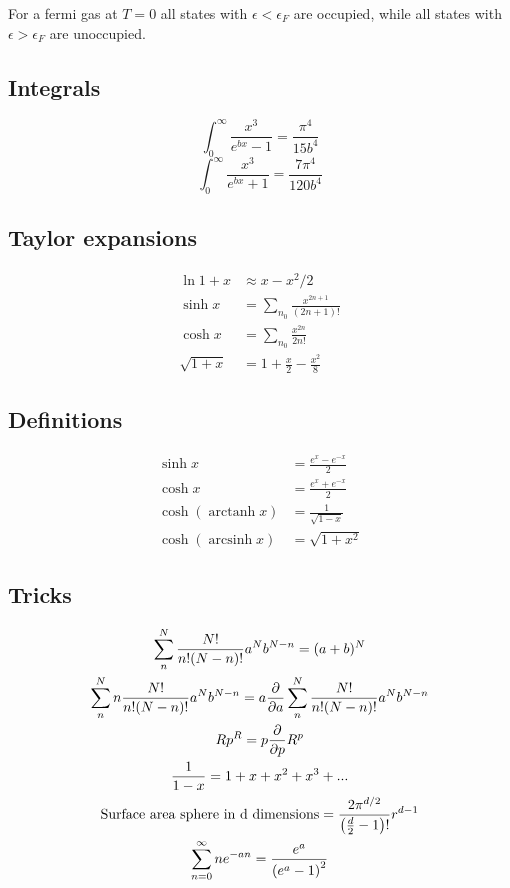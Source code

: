 \documentclass[a4paper, norsk, 8pt]{article}
\DeclareMathOperator{\arcsinh}{arcsinh}
\DeclareMathOperator{\arctanh}{arctanh}
\begin{document}
\begin{multicols*}{3}
For a fermi gas at $T=0$ all states with $\epsilon < \epsilon_F$ are occupied, while all states with $\epsilon > \epsilon_F$ are unoccupied.
\subsection*{\footnotesize  Integrals}
$$ \int_0^{\infty} \frac{x^3}{e^{bx}-1} = \frac{\pi^4}{15b^4}$$
$$ \int_0^{\infty} \frac{x^3}{e^{bx}+1} = \frac{7\pi^4}{120b^4}$$

\subsection*{\footnotesize  Taylor expansions}
\begin{align*}
  \ln{1+x} &\approx x - x^2/2 \\
  \sinh{x} &= \sum_{n_0} \frac{x^{2n+1}}{(2n+1)!} \\
  \cosh{x} &= \sum_{n_0} \frac{x^{2n}}{2n!}\\
  \sqrt{1+x} &= 1 + \frac{x}{2} - \frac{x^2}{8}
\end{align*}

\subsection*{\footnotesize  Definitions}

\begin{align*}
  \sinh{x} &= \frac{e^{x}-e^{-x}}{2} \\
  \cosh{x} &= \frac{e^{x}+e^{-x}}{2} \\
  \cosh{\left( \arctanh{x} \right)} &= \frac{1}{\sqrt{1-x}} \\
  \cosh{\left( \arcsinh{x} \right)} &= \sqrt{1+x^2}
\end{align*}

\subsection*{\footnotesize  Tricks}
\begin{gather*}
  \sum_{n}^{N} \frac{N!}{n!(N-n)!}a^Nb^{N-n} = (a+b)^N \\
  \sum_{n}^{N} n\frac{N!}{n!(N-n)!}a^Nb^{N-n} = a\pdv{}{a}\sum_{n}^{N} \frac{N!}{n!(N-n)!}a^Nb^{N-n} \\
  Rp^{R} = p \pdv{}{p}R^{p} \\
  \frac{1}{1-x} = 1 + x + x^2 + x^3 +... \\
  \text{Surface area sphere in d dimensions} = \frac{2\pi^{d/2}}{\left( \frac{d}{2} - 1 \right)!}r^{d-1}\\
  \sum_{n=0}^{\infty} ne^{-an} = \frac{e^{a}}{\left(e^a-1\right)^2}
\end{gather*}


\end{multicols*}
\end{document}
